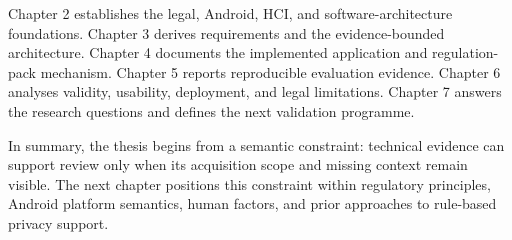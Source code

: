 Chapter 2 establishes the legal, Android, HCI, and software-architecture foundations. Chapter 3 derives requirements and the evidence-bounded architecture. Chapter 4 documents the implemented application and regulation-pack mechanism. Chapter 5 reports reproducible evaluation evidence. Chapter 6 analyses validity, usability, deployment, and legal limitations. Chapter 7 answers the research questions and defines the next validation programme.

In summary, the thesis begins from a semantic constraint: technical evidence can support review only when its acquisition scope and missing context remain visible. The next chapter positions this constraint within regulatory principles, Android platform semantics, human factors, and prior approaches to rule-based privacy support.
